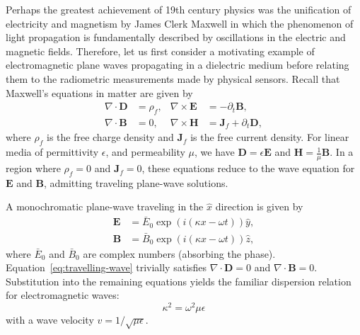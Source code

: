 Perhaps the greatest achievement of 19th century physics was the unification of
electricity and magnetism by James Clerk Maxwell in which the phenomenon of
light propagation is fundamentally described by oscillations in the electric and
magnetic fields. Therefore, let us first consider a motivating example of
electromagnetic plane waves propagating in a dielectric medium before relating them to
the radiometric measurements made by physical sensors. Recall that Maxwell's
equations in matter are given by
\begin{equation}\label{eq:maxwell}
  \begin{aligned}
    \nabla \cdot \mathbf{D} &= \rho_f, & \nabla \times \mathbf{E} &= - \partial_t \mathbf{B}, \\
    \nabla \cdot \mathbf{B} &= 0, & \nabla \times \mathbf{H} &= \mathbf{J}_f + \partial_t\mathbf{D},
  \end{aligned}
\end{equation}
where $\rho_f$ is the free charge density and $\mathbf{J}_f$ is the free current
density. For linear media of permittivity $\epsilon$, and permeability $\mu$, we
have $\mathbf{D}=\epsilon\mathbf{E}$ and $\mathbf{H}=\frac{1}{\mu}\mathbf{B}$.
In a region where $\rho_f=0$ and $\mathbf{J}_f=0$, these equations reduce to the
wave equation for $\mathbf{E}$ and $\mathbf{B}$, admitting traveling plane-wave
solutions.

A monochromatic plane-wave traveling in the $\hat{x}$ direction is given by
\begin{equation}\label{eq:travelling-wave}
  \begin{aligned}
    \mathbf{E} &= \bar{E}_0\exp(i(\kappa x - \omega t))\hat{y}, \\
    \mathbf{B} &= \bar{B}_0\exp(i(\kappa x - \omega t))\hat{z},
  \end{aligned}
\end{equation}
where $\bar{E}_0$ and $\bar{B}_0$ are complex numbers
(absorbing the phase). Equation~\ref{eq:travelling-wave} trivially satisfies
$\nabla \cdot \mathbf{D} = 0$ and $\nabla \cdot \mathbf{B} = 0$. Substitution into
the remaining equations yields the familiar dispersion relation for
electromagnetic waves:
\begin{equation}
  \kappa^2 = \omega^2\mu\epsilon
\end{equation}
with a wave velocity $v=1/\sqrt{\mu\epsilon}$.


